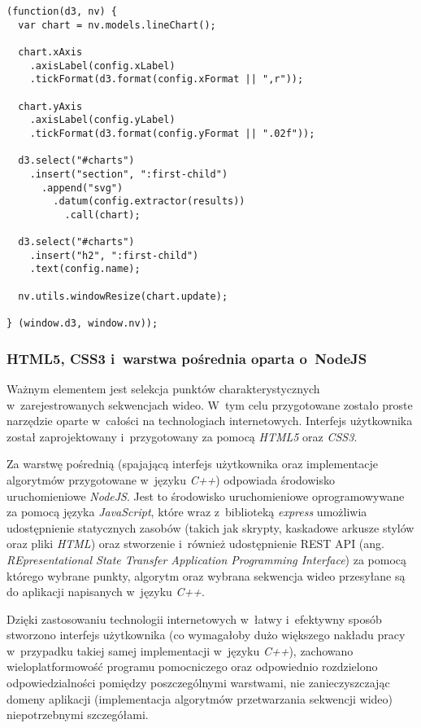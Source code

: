       \begin{sample}[ht]
        \begin{verbatim}
(function(d3, nv) {
  var chart = nv.models.lineChart();

  chart.xAxis
    .axisLabel(config.xLabel)
    .tickFormat(d3.format(config.xFormat || ",r"));

  chart.yAxis
    .axisLabel(config.yLabel)
    .tickFormat(d3.format(config.yFormat || ".02f"));

  d3.select("#charts")
    .insert("section", ":first-child")
      .append("svg")
        .datum(config.extractor(results))
          .call(chart);

  d3.select("#charts")
    .insert("h2", ":first-child")
    .text(config.name);

  nv.utils.windowResize(chart.update);

} (window.d3, window.nv));
        \end{verbatim}
        \caption{Skrypt przygotowujący wykres liniowy za pomocą biblioteki d3.js}
        \label{ChartForRunningTimePerAlgorithm}
      \end{sample}

      \subsubsection{HTML5, CSS3 i~warstwa pośrednia oparta o~NodeJS}\label{Subsection_NodeJS}
      Ważnym elementem jest selekcja punktów charakterystycznych w~zarejestrowanych sekwencjach wideo. W~tym celu przygotowane zostało proste narzędzie oparte w~całości na technologiach internetowych. Interfejs użytkownika został zaprojektowany i~przygotowany za pomocą \textit{HTML5} oraz \textit{CSS3}.

      Za warstwę pośrednią (spajającą interfejs użytkownika oraz implementacje algorytmów przygotowane w~języku \textit{C++}) odpowiada środowisko uruchomieniowe \textit{NodeJS}. Jest to środowisko uruchomieniowe oprogramowywane za pomocą języka \textit{JavaScript}, które wraz z~biblioteką \textit{express} umożliwia udostępnienie statycznych zasobów (takich jak skrypty, kaskadowe arkusze stylów oraz pliki \textit{HTML}) oraz stworzenie i~również udostępnienie REST API (ang. \textit{REpresentational State Transfer Application Programming Interface}) za pomocą którego wybrane punkty, algorytm oraz wybrana sekwencja wideo przesyłane są do aplikacji napisanych w~języku \textit{C++}.

      Dzięki zastosowaniu technologii internetowych w~łatwy i~efektywny sposób stworzono interfejs użytkownika (co wymagałoby dużo większego nakładu pracy w~przypadku takiej samej implementacji w~języku \textit{C++}), zachowano wieloplatformowość programu pomocniczego oraz odpowiednio rozdzielono odpowiedzialności pomiędzy poszczególnymi warstwami, nie zanieczyszczając domeny aplikacji (implementacja algorytmów przetwarzania sekwencji wideo) niepotrzebnymi szczegółami.

